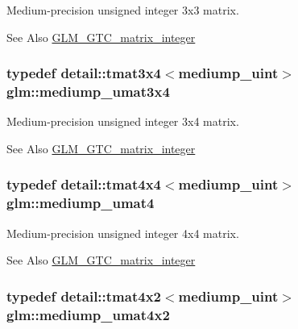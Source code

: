 Medium-\/precision unsigned integer 3x3 matrix. 

\begin{DoxySeeAlso}{See Also}
\hyperlink{group__gtc__matrix__integer}{G\-L\-M\-\_\-\-G\-T\-C\-\_\-matrix\-\_\-integer} 
\end{DoxySeeAlso}
\hypertarget{group__gtc__matrix__integer_gac432c4520a4843bd269d4393a19031a4}{
\subsubsection[{mediump\-\_\-umat3x4}]{\setlength{\rightskip}{0pt plus 5cm}typedef detail\-::tmat3x4$<$mediump\-\_\-uint$>$ {\bf glm\-::mediump\-\_\-umat3x4}}}\label{group__gtc__matrix__integer_gac432c4520a4843bd269d4393a19031a4}


Medium-\/precision unsigned integer 3x4 matrix. 

\begin{DoxySeeAlso}{See Also}
\hyperlink{group__gtc__matrix__integer}{G\-L\-M\-\_\-\-G\-T\-C\-\_\-matrix\-\_\-integer} 
\end{DoxySeeAlso}
\hypertarget{group__gtc__matrix__integer_ga41f8522ec6855007e5221193b58b156b}{
\subsubsection[{mediump\-\_\-umat4}]{\setlength{\rightskip}{0pt plus 5cm}typedef detail\-::tmat4x4$<$mediump\-\_\-uint$>$ {\bf glm\-::mediump\-\_\-umat4}}}\label{group__gtc__matrix__integer_ga41f8522ec6855007e5221193b58b156b}


Medium-\/precision unsigned integer 4x4 matrix. 

\begin{DoxySeeAlso}{See Also}
\hyperlink{group__gtc__matrix__integer}{G\-L\-M\-\_\-\-G\-T\-C\-\_\-matrix\-\_\-integer} 
\end{DoxySeeAlso}
\hypertarget{group__gtc__matrix__integer_gaa1c11ec784503a43fbf8f52f5ed47ef1}{
\subsubsection[{mediump\-\_\-umat4x2}]{\setlength{\rightskip}{0pt plus 5cm}typedef detail\-::tmat4x2$<$mediump\-\_\-uint$>$ {\bf glm\-::mediump\-\_\-umat4x2}}}\label{group__gtc__matrix__integer_gaa1c11ec784503a43fbf8f52f5ed47ef1}


